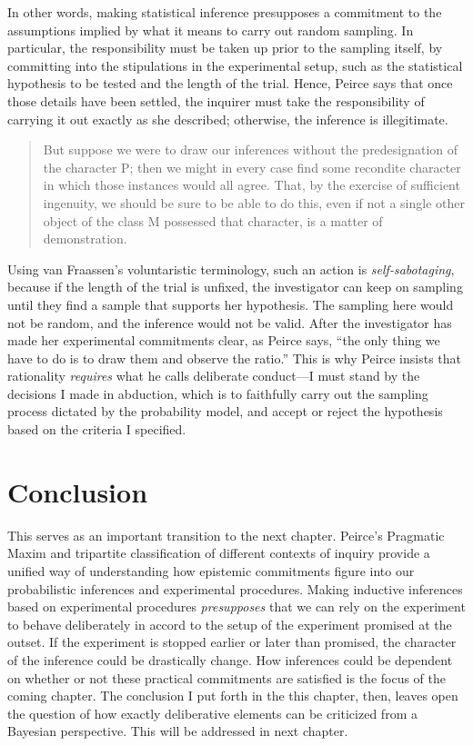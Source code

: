 In other words, making statistical inference presupposes a commitment to
the assumptions implied by what it means to carry out random sampling.
In particular, the responsibility must be taken up prior to the sampling
itself, by committing into the stipulations in the experimental setup,
such as the statistical hypothesis to be tested and the length of the
trial. Hence, Peirce says that once those details have been settled, the
inquirer must take the responsibility of carrying it out exactly as she
described; otherwise, the inference is illegitimate.

\begin{quote}
But suppose we were to draw our inferences without the predesignation of
the character P; then we might in every case find some recondite
character in which those instances would all agree. That, by the
exercise of sufficient ingenuity, we should be sure to be able to do
this, even if not a single other object of the class M possessed that
character, is a matter of demonstration.
\end{quote}

Using van Fraassen's voluntaristic terminology, such an action is
\emph{self-sabotaging}, because if the length of the trial is unfixed,
the investigator can keep on sampling until they find a sample that
supports her hypothesis. The sampling here would not be random, and the
inference would not be valid. After the investigator has made her
experimental commitments clear, as Peirce says, ``the only thing we have
to do is to draw them and observe the ratio.'' This is why Peirce
insists that rationality \emph{requires} what he calls deliberate
conduct---I must stand by the decisions I made in abduction, which is to
faithfully carry out the sampling process dictated by the probability
model, and accept or reject the hypothesis based on the criteria I
specified. 

\section{Conclusion}

This serves as an important transition to the next chapter. Peirce's Pragmatic Maxim and tripartite classification of different contexts of inquiry provide a unified way of understanding how epistemic commitments figure into our probabilistic inferences and experimental procedures. Making inductive inferences based on experimental procedures \emph{presupposes} that we can rely on the experiment to behave deliberately in accord to the setup of the experiment promised at the outset. If the experiment is stopped earlier or later than promised, the character of the inference could be drastically change. How inferences could be dependent on whether or not these practical commitments are satisfied is the focus of the coming chapter. The conclusion I put forth in the this chapter, then, leaves open the question of how exactly deliberative elements can be criticized from a Bayesian perspective. This will be addressed in next chapter.

